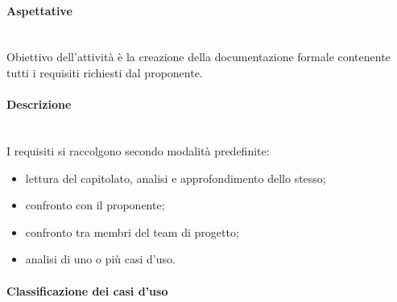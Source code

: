 \paragraph*{Aspettative} \mbox{}\\

\noindent Obiettivo dell'attività è la creazione della documentazione formale 
contenente tutti i requisiti richiesti dal proponente.			
\paragraph*{Descrizione} \mbox{}\\

\noindent I requisiti si raccolgono secondo modalità predefinite:
	\begin{itemize}
		\item lettura del capitolato\glo, analisi e approfondimento dello stesso;
		\item confronto con il proponente;
		\item confronto tra membri del team di progetto;
		\item analisi di uno o più casi d'uso.  \\
	\end{itemize}
	

\paragraph*{Classificazione dei casi d'uso} \mbox{}\\


